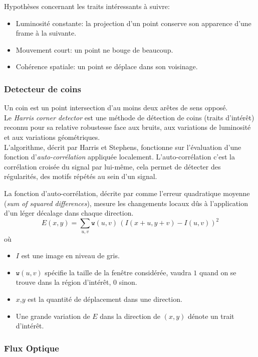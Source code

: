 \documentclass[a4paper,11pt]{report}
\begin{document}
Hypothèses concernant les traits intéressants à suivre:
\begin{itemize}
\item Luminosité constante: la projection d'un point conserve son apparence d'une frame à la suivante.
\item Mouvement court: un point ne bouge de beaucoup.
\item Cohérence spatiale: un point se déplace dans son voisinage.
\end{itemize}

\subsubsection{Detecteur de coins}
Un coin est un point intersection d'au moins deux arêtes de sens opposé.\\

Le \textit{Harris corner detector} est une méthode de détection de coins (traits d'intérêt) reconnu pour sa relative robustesse face aux bruits, aux variations de luminosité et aux variations géométriques. \\

L'algorithme, décrit par Harris et Stephens, fonctionne sur l'évaluation d'une fonction d'\textit{auto-corrélation} appliquée localement. 
L'auto-corrélation c'est la corrélation croisée du signal par lui-même, cela permet de détecter des régularités, des motifs répétés au sein d'un signal.   

La fonction d'auto-corrélation, décrite par \cite{q} comme l'erreur quadratique moyenne (\textit{sum of squared differences}), mesure les changements locaux dûs à l'application d'un léger décalage dans chaque direction.\\
$$
E(x,y) = \sum_{u,v} \texttt{w}(u,v) \, \left( I(x+u,y+v) - I(u,v)\right)^2
$$
où
\begin{itemize}
\item[]$I$ est une image en niveau de gris.
\item[]$\texttt{w}(u,v)$ spécifie la taille de la fenêtre considérée, vaudra $1$ quand on se trouve dans la région d'intérêt, $0$ sinon.
\item[]$x$,$y$ est la quantité de déplacement dans une direction.
\item[]Une grande variation de $E$ dans la direction de $(x,y)$ dénote un trait d'intérêt.
\end{itemize}

\subsubsection{Flux Optique}
\end{document}
